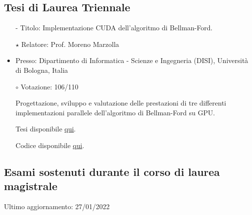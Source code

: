 \documentclass[curriculum-vitae-ita]{subfiles}
\begin{document}
		\subsection*{Tesi di Laurea Triennale}
			\begin{itemize}
				\item[-] {\large Titolo:} Implementazione CUDA dell'algoritmo di Bellman-Ford.
				\item[$\star$] {\large Relatore:} Prof. Moreno Marzolla
				\item {\large Presso:} Dipartimento di Informatica - Scienze e Ingegneria (DISI), Università di Bologna, Italia
				\item[$\circ$] {\large Votazione:} 106/110
				\item[] Progettazione, sviluppo e valutazione delle prestazioni di tre differenti implementazioni parallele dell'algoritmo di Bellman-Ford su GPU.
				\item[] Tesi disponibile \href{https://amslaurea.unibo.it/24313}{qui}.
				\item[] Codice disponibile \href{https://github.com/Ledmington/bellman-ford-cuda}{qui}.
			\end{itemize}
		
		\subsection*{Esami sostenuti durante il corso di laurea magistrale}
			{\small Ultimo aggiornamento: 27/01/2022}
			\medskip
			
			\begin{minipage}[t]{.47\textwidth}
			\end{minipage}
			\hfill
			\begin{minipage}[t]{.47\textwidth}
			\end{minipage}
\end{document}
